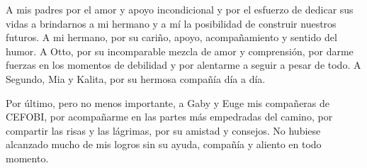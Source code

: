 A mis padres por el amor y apoyo incondicional y por el esfuerzo  de  dedicar  sus  vidas  a  brindarnos  a mi hermano y a mí la  posibilidad  de construir nuestros futuros. A mi hermano, por su cariño, apoyo, acompañamiento y sentido del humor. A Otto, por su incomparable mezcla de amor y comprensión, por darme fuerzas en los momentos de debilidad y por alentarme a seguir a pesar de todo. A Segundo, Mia y Kalita, por su hermosa compañía día a día.

Por último, pero no menos importante, a Gaby y Euge mis compañeras de CEFOBI, por acompañarme en las partes más empedradas del camino, por compartir las risas y las  lágrimas, por su amistad y consejos. No hubiese alcanzado mucho de mis logros sin su ayuda, compañía y aliento en todo momento.




